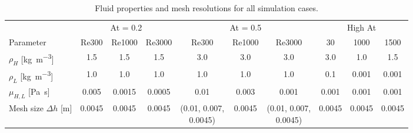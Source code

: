 {\begin{table}[htbp]
\small
\centering
{}
\setlength{\tabcolsep}{4pt}
\begin{tabular}{@{}l ccc ccc ccc@{}}
\toprule
& \multicolumn{3}{c}{At = 0.2} & \multicolumn{3}{c}{At = 0.5} & \multicolumn{3}{c}{High At} \\
\cmidrule(lr){2-4} \cmidrule(lr){5-7} \cmidrule(lr){8-10}
Parameter & Re300 & Re1000 & Re3000 & Re300 & Re1000 & Re3000 & 30 & 1000 & 1500 \\
\midrule
$\rho_H$ [\si{kg.m^{-3}}] & 1.5 & 1.5 & 1.5 & 3.0 & 3.0 & 3.0 & 3.0 & 1.0 & 1.5 \\
$\rho_L$ [\si{kg.m^{-3}}] & 1.0 & 1.0 & 1.0 & 1.0 & 1.0 & 1.0 & 0.1 & 0.001 & 0.001 \\
$\mu_{H,L}$ [\si{Pa.s}] & 0.005 & 0.0015 & 0.0005 & 0.01 & 0.003 & 0.001 & 0.001 & 0.001 & 0.001 \\
Mesh size $\Delta h$ [\si{m}] & 0.0045 & 0.0045 & 0.0045 & 
\makecell[r]{(0.01, 0.007,\\ 0.0045)} & 0.0045 & 
\makecell[r]{(0.01, 0.007,\\ 0.0045)} & 0.0045 & 0.0045 & 0.0045 \\
\bottomrule
\end{tabular}
\caption{Fluid properties and mesh resolutions for all simulation cases.}
\label{tab:rt-parameter-matrix}
\end{table}

}
